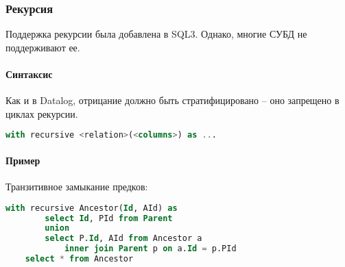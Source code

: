 \subsubsection{Рекурсия}

Поддержка рекурсии была добавлена в SQL3. Однако, многие СУБД не поддерживают ее.

\paragraph{Синтаксис}

Как и в Datalog, отрицание должно быть стратифицировано -- оно запрещено в циклах рекурсии.

\begin{lstlisting}[language=SQL]
    with recursive <relation>(<columns>) as ...
\end{lstlisting}

\paragraph{Пример}

Транзитивное замыкание предков:

\begin{lstlisting}[language=SQL]
    with recursive Ancestor(Id, AId) as
        select Id, PId from Parent
        union
        select P.Id, AId from Ancestor a
            inner join Parent p on a.Id = p.PId
    select * from Ancestor
\end{lstlisting}
